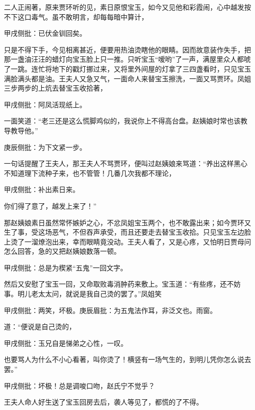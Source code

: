 \begin{parag}
    二人正闹著，原来贾环听的见，素日原恨宝玉，如今又见他和彩霞闹，心中越发按不下这口毒气。虽不敢明言，却每每暗中算计，\begin{note}甲戌侧批：已伏金钏回矣。\end{note}只是不得下手，今见相离甚近，便要用热油烫瞎他的眼睛。因而故意装作失手，把那一盏油汪汪的蜡灯向宝玉脸上只一推。只听宝玉“嗳哟”了一声，满屋里众人都唬了一跳。连忙将地下的戳灯挪过来，又将里外间屋的灯拿了三四盏看时，只见宝玉满脸满头都是油。王夫人又急又气，一面命人来替宝玉擦洗，一面又骂贾环。凤姐三步两步的上炕去替宝玉收拾著，\begin{note}甲戌侧批：阿凤活现纸上。\end{note}一面笑道：“老三还是这么慌脚鸡似的，我说你上不得高台盘。赵姨娘时常也该教导教导他。”\begin{note}庚辰侧批：为下文紧一步。\end{note}一句话提醒了王夫人，那王夫人不骂贾环，便叫过赵姨娘来骂道：“养出这样黑心不知道理下流种子来，也不管管！几番几次我都不理论，\begin{note}甲戌侧批：补出素日来。\end{note}你们得了意了，越发上来了！”
\end{parag}


\begin{parag}
    那赵姨娘素日虽然常怀嫉妒之心，不忿凤姐宝玉两个，也不敢露出来；如今贾环又生了事，受这场恶气，不但吞声承受，而且还要走去替宝玉收拾。只见宝玉左边脸上烫了一溜燎泡出来，幸而眼睛竟没动。王夫人看了，又是心疼，又怕明日贾母问怎么回答，急的又把赵姨娘数落一顿。\begin{note}甲戌侧批：总是为楔紧“五鬼”一回文字。\end{note}然后又安慰了宝玉一回，又命取败毒消肿药来敷上。宝玉道：“有些疼，还不妨事。明儿老太太问，就说是我自己烫的罢了。”凤姐笑\begin{note}甲戌侧批：两笑，坏极。庚辰眉批：为五鬼法作耳，非泛文也。雨窗。\end{note}道：“便说是自己烫的，\begin{note}甲戌侧批：玉兄自是悌弟之心性，一叹。\end{note}也要骂人为什么不小心看著，叫你烫了！横竖有一场气生的，到明儿凭你怎么说去罢。”\begin{note}甲戌侧批：坏极！总是调唆口吻，赵氏宁不觉乎？\end{note}王夫人命人好生送了宝玉回房去后，袭人等见了，都慌的了不得。
\end{parag}


